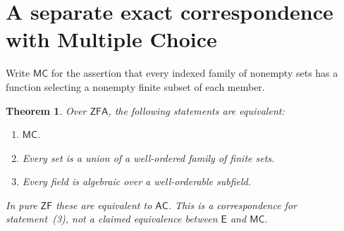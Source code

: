 \documentclass[11pt,a4paper]{article}
\newtheorem{theorem}{Theorem}[section]
\theoremstyle{definition}\newtheorem{definition}[theorem]{Definition}
\theoremstyle{remark}\newtheorem{remark}[theorem]{Remark}
\newcommand{\ZF}{\mathsf{ZF}}\newcommand{\ZFA}{\mathsf{ZFA}}
\newcommand{\AC}{\mathsf{AC}}\newcommand{\BPI}{\mathsf{BPI}}
\newcommand{\E}{\mathsf E}\newcommand{\U}{\mathsf U}
\begin{document}
\section{A separate exact correspondence with Multiple Choice}\label{sec:mcfield}
Write $\mathsf{MC}$ for the assertion that every indexed family of nonempty sets has a function selecting a nonempty finite subset of each member.
\begin{theorem}\label{thm:mcfield}
Over $\ZFA$, the following statements are equivalent:
\begin{enumerate}
\item $\mathsf{MC}$.
\item Every set is a union of a well-ordered family of finite sets.
\item Every field is algebraic over a well-orderable subfield.
\end{enumerate}
In pure $\ZF$ these are equivalent to $\AC$. This is a correspondence for statement~(3), not a claimed equivalence between $\E$ and $\mathsf{MC}$.
\end{theorem}
\end{document}
